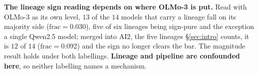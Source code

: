 \textbf{The lineage sign reading depends on where OLMo-3 is put.} Read with OLMo-3 as its own level, $13$ of the $14$ models that carry a lineage fall on its majority side ($\mathrm{frac}=0.030$), five of six lineages being sign-pure and the exception a single Qwen2.5 model; merged into AI2, the five lineages \S\ref{sec:intro} counts, it is $12$ of $14$ ($\mathrm{frac}=0.092$) and the sign no longer clears the bar. The magnitude result holds under both labellings. \textbf{Lineage and pipeline are confounded here}, so neither labelling names a mechanism.
